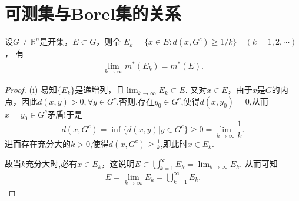\documentclass[../../main.tex]{subfiles}
\begin{document}
\section{可测集与Borel集的关系}

\begin{lemma}[Carathéodory引理]\label{lemma:卡拉西奥多里引理}
设$G\neq\mathbb{R}^n$是开集，$E\subset G$，则令
$E_k = \{x\in E:d(x,G^c)\geqslant 1/k\}\quad (k = 1,2,\cdots)$，
有
\begin{align*}
\lim_{k\to\infty}m^*(E_k)=m^*(E).
\end{align*}
\end{lemma}
\begin{proof}
(i) 易知$\{E_k\}$是递增列，且$\lim_{k\to\infty}E_k\subset E$. 又对$x\in E$，由于$x$是$G$的内点，因此$d(x,y)>0,\forall y\in G^c$,否则,存在$y_0\in G^c$,使得$d(x,y_0)=0$,从而$x=y_0\in G^c$矛盾!于是$$d(x,G^c)=\inf\{d(x,y)|y\in G^c\} \geqslant  0=\lim_{k\to \infty}\frac{1}{k}.$$
进而存在充分大的$k>0$,使得$d(x,G^c)\geqslant \frac{1}{k}$,即此时$x\in E_k$.

故当$k$充分大时,必有$x\in E_k$，这说明$E\subset\bigcup_{k = 1}^{\infty}E_k=\lim_{k\to\infty}E_k$. 从而可知
\begin{align*}
E=\lim_{k\to\infty}E_k=\bigcup_{k = 1}^{\infty}E_k.
\end{align*}


\end{proof}
\end{document}
